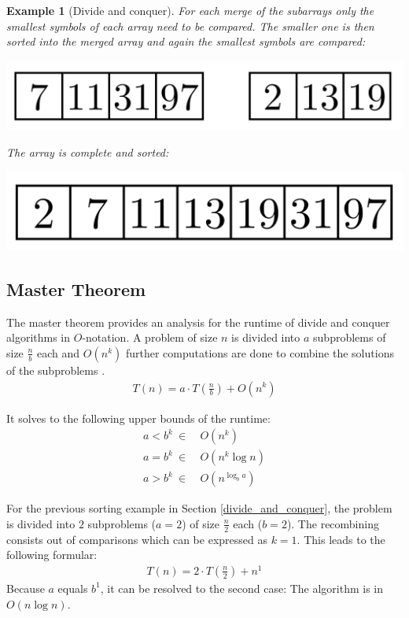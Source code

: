 \documentclass[a4paper, 11pt]{article}
\newtheorem*{example*}{Example}
\begin{document}
\begin{example*}[Divide and conquer]
\newpage
For each merge of the subarrays only the smallest symbols of each array need to be compared. The smaller one is then sorted into the merged array and again the smallest symbols are compared:
\begin{center}
\includegraphics[scale=0.125]{images/merge6.png}
\end{center}

The array is complete and sorted:
\begin{center}
\includegraphics[scale=0.125]{images/merge7.png}
\end{center}


\end{example*}


\subsection{Master Theorem}
\label{Master_Theorem}

The master theorem provides an analysis for the runtime of divide and conquer algorithms in $O$-notation. A problem of size $n$ is divided into $a$ subproblems of size $\frac{n}{b}$ each and $O(n^k)$ further computations are done to combine the solutions of the subproblems \cite{MT}. 
\begin{align*}
	T(n)=a \cdot T(\frac{n}{b}) + O(n^k)
\end{align*} 

It solves to the following upper bounds of the runtime:
\begin{align}
	a < b^k \ \in & \  O(n^k) \\
	a = b^k \ \in & \  O(n^k \log n) \\
	a > b^k \ \in & \  O(n^{\log_b a})
\end{align} 

For the previous sorting example in Section \ref{divide_and_conquer}, the problem is divided into $2$ subproblems ($a=2$) of size $\frac{n}{2}$ each ($b=2$). The recombining consists out of comparisons which can be expressed as $k=1$. This leads to the following formular:
\begin{align*}
	T(n)=2 \cdot T(\frac{n}{2}) + n^1
\end{align*} 
Because $a$ equals $b^1$, it can be resolved to the second case: The algorithm is in $O(n \log n)$.
\end{document}
